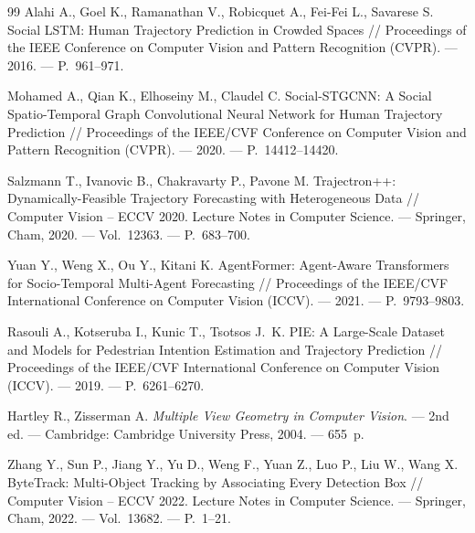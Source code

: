 \documentclass{misisarticle}
\begin{document}
\begin{thebibliography}{99}
 Alahi A., Goel K., Ramanathan V., Robicquet A., Fei-Fei L., Savarese S. Social LSTM: Human Trajectory Prediction in Crowded Spaces // Proceedings of the IEEE Conference on Computer Vision and Pattern Recognition (CVPR). --- 2016. --- P.~961--971.

 Mohamed A., Qian K., Elhoseiny M., Claudel C. Social-STGCNN: A Social Spatio-Temporal Graph Convolutional Neural Network for Human Trajectory Prediction // Proceedings of the IEEE/CVF Conference on Computer Vision and Pattern Recognition (CVPR). --- 2020. --- P.~14412--14420.

 Salzmann T., Ivanovic B., Chakravarty P., Pavone M. Trajectron++: Dynamically-Feasible Trajectory Forecasting with Heterogeneous Data // Computer Vision -- ECCV 2020. Lecture Notes in Computer Science. --- Springer, Cham, 2020. --- Vol.~12363. --- P.~683--700.

 Yuan Y., Weng X., Ou Y., Kitani K. AgentFormer: Agent-Aware Transformers for Socio-Temporal Multi-Agent Forecasting // Proceedings of the IEEE/CVF International Conference on Computer Vision (ICCV). --- 2021. --- P.~9793--9803.

 Rasouli A., Kotseruba I., Kunic T., Tsotsos J.~K. PIE: A Large-Scale Dataset and Models for Pedestrian Intention Estimation and Trajectory Prediction // Proceedings of the IEEE/CVF International Conference on Computer Vision (ICCV). --- 2019. --- P.~6261--6270.

 Hartley R., Zisserman A. \textit{Multiple View Geometry in Computer Vision}. --- 2nd ed. --- Cambridge: Cambridge University Press, 2004. --- 655~p.

 Zhang Y., Sun P., Jiang Y., Yu D., Weng F., Yuan Z., Luo P., Liu W., Wang X. ByteTrack: Multi-Object Tracking by Associating Every Detection Box // Computer Vision -- ECCV 2022. Lecture Notes in Computer Science. --- Springer, Cham, 2022. --- Vol.~13682. --- P.~1--21.

\end{thebibliography}
\end{document}
